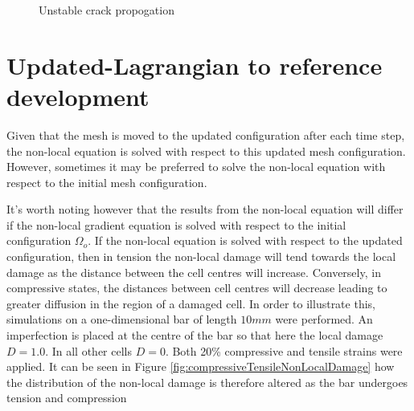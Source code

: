 \documentclass[sn-mathphys,Numbered,draft]{sn-jnl}%
\begin{document}
\begin{figure}[htbp]
	\centering
		
		
		\caption{Unstable crack propogation}
	\label{simulatedDamageNotLimited}
\end{figure}
\FloatBarrier

\section{Updated-Lagrangian to reference development}
\label{Updated-Lagrangian to reference development}
Given that the mesh is moved to the updated configuration after each time step, the non-local equation is solved with respect to this updated mesh configuration. However, sometimes it may be preferred to solve the non-local equation with respect to the initial mesh configuration.

It's worth noting however that the results from the non-local equation will differ if the non-local gradient equation is solved with respect to the initial configuration $\Omega_o$. If the non-local equation is solved with respect to the updated configuration, then in tension the non-local damage will tend towards the local damage as the distance between the cell centres will increase. Conversely, in compressive states, the distances between cell centres will decrease leading to greater diffusion in the region of a damaged cell. In order to illustrate this, simulations on a one-dimensional bar of length $10mm$ were performed. An imperfection is placed at the centre of the bar so that here the local damage $D=1.0$. In all other cells $D=0$. Both 20\% compressive and tensile strains were applied. It can be seen in Figure \ref{fig:compressiveTensileNonLocalDamage} how the distribution of the non-local damage is therefore altered as the bar undergoes tension and compression 
\end{document}
